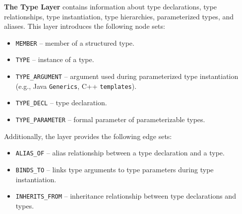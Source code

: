 \textbf{The Type Layer} contains information about type declarations, type relationships, type instantiation, type hierarchies, parameterized types, and aliases. This layer introduces the following node sets:
\begin{itemize}
    \item \texttt{MEMBER} -- member of a structured type.
    \item \texttt{TYPE} -- instance of a type.
    \item \texttt{TYPE\_ARGUMENT} -- argument used during parameterized type instantiation (e.g., Java \texttt{Generics}, C++ \texttt{templates}).
    \item \texttt{TYPE\_DECL} -- type declaration.
    \item \texttt{TYPE\_PARAMETER} -- formal parameter of parameterizable types.
\end{itemize}
Additionally, the layer provides the following edge sets:
\begin{itemize}
    \item \texttt{ALIAS\_OF} -- alias relationship between a type declaration and a type.
    \item \texttt{BINDS\_TO} -- links type arguments to type parameters during type instantiation.
    \item \texttt{INHERITS\_FROM} -- inheritance relationship between type declarations and types.
\end{itemize}

